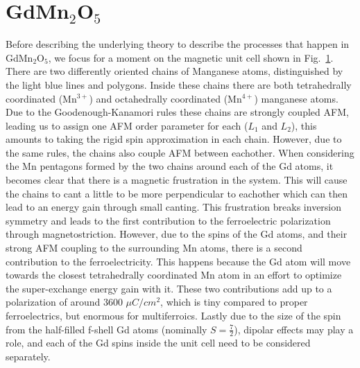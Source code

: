 \section{GdMn$_2$O$_5$}
Before describing the underlying theory to describe the processes that happen in GdMn$_2$O$_5$, we focus for a moment on the magnetic unit cell shown in Fig.~\ref{fig:GdMn2O5_unit_cell}. There are two differently oriented chains of Manganese atoms, distinguished by the light blue lines and polygons. Inside these chains there are both tetrahedrally coordinated (Mn$^{3+}$) and octahedrally coordinated (Mn$^{4+}$) manganese atoms. Due to the Goodenough-Kanamori rules these chains are strongly coupled AFM, leading us to assign one AFM order parameter for each ($L_1$ and $L_2$), this amounts to taking the rigid spin approximation in each chain. However, due to the same rules, the chains also couple AFM between eachother. When considering the Mn pentagons formed by the two chains around each of the Gd atoms, it becomes clear that there is a magnetic frustration in the system. This will cause the chains to cant a little to be more perpendicular to eachother which can then lead to an energy gain through small canting. This frustration breaks inversion symmetry and leads to the first contribution to the ferroelectric polarization through magnetostriction. However, due to the spins of the Gd atoms, and their strong AFM coupling to the surrounding Mn atoms, there is a second contribution to the ferroelectricity. This happens because the Gd atom will move towards the closest tetrahedrally coordinated Mn atom in an effort to optimize the super-exchange energy gain with it. These two contributions add up to a polarization of around 3600 $\mu C/cm^2$, which is tiny compared to proper ferroelectrics, but enormous for multiferroics. Lastly due to the size of the spin from the half-filled f-shell Gd atoms (nominally $S=\frac{7}{2}$), dipolar effects may play a role, and each of the Gd spins inside the unit cell need to be considered separately. 
\begin{figure}
	\caption{\label{fig:GdMn2O5_unit_cell}}
\end{figure}

